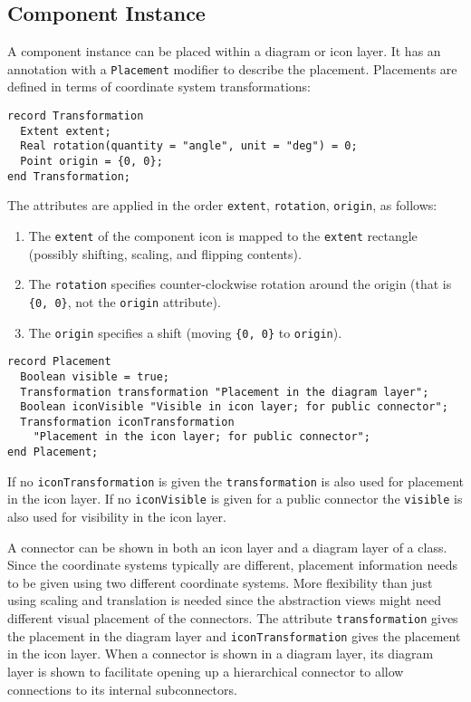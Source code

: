 \subsection{Component Instance}\label{component-instance}

A component instance can be placed within a diagram or icon layer.
It has an annotation with a \lstinline!Placement! modifier to describe the placement.
Placements are defined in terms of coordinate system transformations:
\begin{lstlisting}[language=modelica]
record Transformation
  Extent extent;
  Real rotation(quantity = "angle", unit = "deg") = 0;
  Point origin = {0, 0};
end Transformation;
\end{lstlisting}%
The attributes are applied in the order \lstinline!extent!, \lstinline!rotation!, \lstinline!origin!, as follows:
\begin{enumerate}
\item
  The \lstinline!extent! of the component icon is mapped to the \lstinline!extent! rectangle (possibly shifting, scaling, and flipping contents).
\item
  The \lstinline!rotation! specifies counter-clockwise rotation around the origin (that is \lstinline!{0, 0}!, not the \lstinline!origin! attribute).
\item
  The \lstinline!origin! specifies a shift (moving \lstinline!{0, 0}! to \lstinline!origin!).
\end{enumerate}

\begin{lstlisting}[language=modelica]
record Placement
  Boolean visible = true;
  Transformation transformation "Placement in the diagram layer";
  Boolean iconVisible "Visible in icon layer; for public connector";
  Transformation iconTransformation
    "Placement in the icon layer; for public connector";
end Placement;
\end{lstlisting}%
If no \lstinline!iconTransformation! is given the \lstinline!transformation! is also used for placement in the icon layer.
If no \lstinline!iconVisible! is given for a public connector the \lstinline!visible! is also used for visibility in the icon layer.

\begin{nonnormative}
A connector can be shown in both an icon layer and a diagram layer of a class.
Since the coordinate systems typically are different, placement information needs to be given using two different coordinate systems.
More flexibility than just using scaling and translation is needed since the abstraction views might need different visual placement of the connectors.
The attribute \lstinline!transformation! gives the placement in the diagram layer and \lstinline!iconTransformation! gives the placement in the icon layer.
When a connector is shown in a diagram layer, its diagram layer is shown to facilitate opening up a hierarchical connector to allow connections to its internal subconnectors.
\end{nonnormative}

